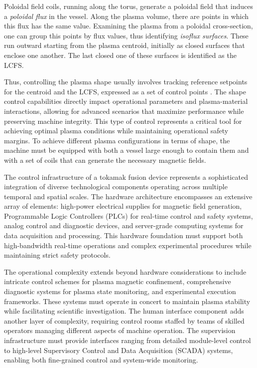 Poloidal field coils, running along the torus, generate a poloidal field that induces a \emph{poloidal flux} in the vessel. Along the plasma volume, there are points in which this flux has the same value. Examining the plasma from a poloidal cross-section, one can group this points by flux values, thus identifying \emph{isoflux surfaces}. These run outward starting from the plasma centroid, initially as closed surfaces that enclose one another. The last closed one of these surfaces is identified as the LCFS.

Thus, controlling the plasma shape usually involves tracking reference setpoints for the centroid and the LCFS, expressed as a set of control points \cite{mele_design_2024,tenaglia_unified_2024}. The shape control capabilities directly impact operational parameters and plasma-material interactions, allowing for advanced scenarios that maximize performance while preserving machine integrity. This type of control represents a critical tool for achieving optimal plasma conditions while maintaining operational safety margins. To achieve different plasma configurations in terms of shape, the machine must be equipped with both a vessel large enough to contain them and with a set of coils that can generate the necessary magnetic fields.

The control infrastructure of a tokamak fusion device represents a sophisticated integration of diverse technological components operating across multiple temporal and spatial scales. The hardware architecture encompasses an extensive array of elements: high-power electrical supplies for magnetic field generation, Programmable Logic Controllers (PLCs) for real-time control and safety systems, analog control and diagnostic devices, and server-grade computing systems for data acquisition and processing. This hardware foundation must support both high-bandwidth real-time operations and complex experimental procedures while maintaining strict safety protocols.

The operational complexity extends beyond hardware considerations to include intricate control schemes for plasma magnetic confinement, comprehensive diagnostic systems for plasma state monitoring, and experimental execution frameworks. These systems must operate in concert to maintain plasma stability while facilitating scientific investigation. The human interface component adds another layer of complexity, requiring control rooms staffed by teams of skilled operators managing different aspects of machine operation. The supervision infrastructure must provide interfaces ranging from detailed module-level control to high-level Supervisory Control and Data Acquisition (SCADA) systems, enabling both fine-grained control and system-wide monitoring.

